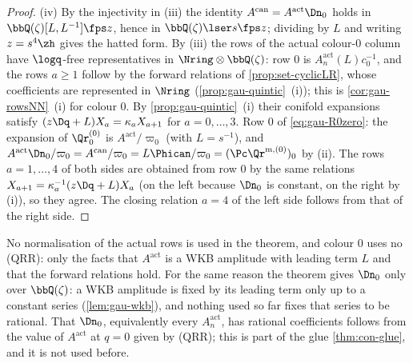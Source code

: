 \begin{proof}
(iv) By the injectivity in (iii) the identity $A^{\mathrm{can}}=A^{\mathrm{act}}\Dn_0$ holds in $\bbQ(\zeta)[L,L^{-1}]\fps z$, hence in $\bbQ(\zeta)\lser s\fps z$; dividing by $L$ and writing $z=s^4\zh$ gives the hatted form. By (iii) the rows of the actual colour-$0$ column have $\logq$-free representatives in $\Nring\otimes\bbQ(\zeta)$: row $0$ is $A^{\mathrm{act}}_n(L)c_0^{-1}$, and the rows $a\geq1$ follow by the forward relations of \cref{prop:set-cyclicLR}, whose coefficients are represented in $\Nring$ (\cref{prop:gau-quintic}~(i)); this is \cref{cor:gau-rowsNN}~(i) for colour $0$. By \cref{prop:gau-quintic}~(i) their conifold expansions satisfy $(z\Dq+L)X_a=\kappa_aX_{a+1}$ for $a=0,\dots,3$. Row $0$ of \eqref{eq:gau-R0zero}: the expansion of $\Qr^{(0)}_0$ is $A^{\mathrm{act}}/\varpi_0$ (with $L=s^{-1}$), and $A^{\mathrm{act}}\Dn_0/\varpi_0=A^{\mathrm{can}}/\varpi_0=L\Phican/\varpi_0=(\Pc\Qr^{\mathrm m,(0)})_0$ by (ii). The rows $a=1,\dots,4$ of both sides are obtained from row $0$ by the same relations $X_{a+1}=\kappa_a^{-1}(z\Dq+L)X_a$ (on the left because $\Dn_0$ is constant, on the right by (i)), so they agree. The closing relation $a=4$ of the left side follows from that of the right side.
\end{proof}

No normalisation of the actual rows is used in the theorem, and colour $0$ uses no (QRR): only the facts that $A^{\mathrm{act}}$ is a WKB amplitude with leading term $L$ and that the forward relations hold. For the same reason the theorem gives $\Dn_0$ only over $\bbQ(\zeta)$: a WKB amplitude is fixed by its leading term only up to a constant series (\cref{lem:gau-wkb}), and nothing used so far fixes that series to be rational. That $\Dn_0$, equivalently every $A^{\mathrm{act}}_n$, has rational coefficients follows from the value of $A^{\mathrm{act}}$ at $q=0$ given by (QRR); this is part of the glue \cref{thm:con-glue}, and it is not used before.


